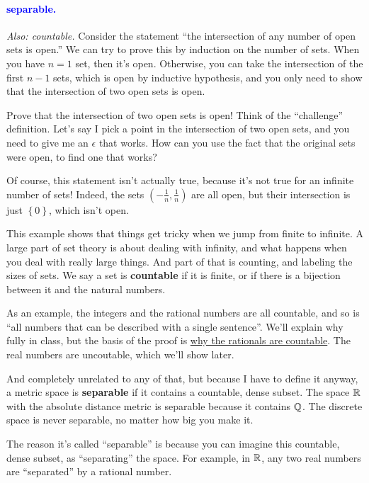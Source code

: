 \documentclass[11pt,paper=letter]{scrartcl}
\renewcommand{\bluebf}[1]{{\bfseries \color{Blue} #1}}
\renewcommand\wp[1]{\paragraph{\textcolor{Blue}{#1.}} \hspace{-1em}}
\newcommand\wl[1]{\label{w:#1}}
\newcommand\oww[1]{\textit{Also: #1.}}
\begin{document}
\wp{separable}
\wl{separable}
\oww{countable}
Consider the statement ``the intersection of any number of open sets is open.'' We can try to prove this by induction on the number of sets. When you have $n = 1$ set, then it's open. Otherwise, you can take the intersection of the first $n - 1$ sets, which is open by inductive hypothesis, and you only need to show that the intersection of two open sets is open.

\begin{exrboxed}
  Prove that the intersection of two open sets is open! Think of the ``challenge'' definition. Let's say I pick a point in the intersection of two open sets, and you need to give me an $\epsilon$ that works. How can you use the fact that the original sets were open, to find one that works?
\end{exrboxed}

Of course, this statement isn't actually true, because it's not true for an infinite number of sets! Indeed, the sets $ \left( - \frac{1}{n} , \frac{1}{n} \right) $ are all open, but their intersection is just $ \left\{ 0 \right\}  $, which isn't open.

This example shows that things get tricky when we jump from finite to infinite. A large part of set theory is about dealing with infinity, and what happens when you deal with really large things. And part of that is counting, and labeling the sizes of sets. We say a set is \textbf{countable} if it is finite, or if there is a bijection between it and the natural numbers.

As an example, the integers and the rational numbers are all countable, and so is ``all numbers that can be described with a single sentence''. We'll explain why fully in class, but the basis of the proof is \href{https://proofwiki.org/wiki/Rational_Numbers_are_Countably_Infinite}{why the rationals are countable}. The real numbers are uncoutable, which we'll show later.

And completely unrelated to any of that, but because I have to define it anyway, a metric space is \bluebf{separable} if it contains a countable, dense subset. The space $\mathbb R$ with the absolute distance metric is separable because it contains $\mathbb Q$. The discrete space is never separable, no matter how big you make it.

\begin{remboxed}
  The reason it's called ``separable'' is because you can imagine this countable, dense subset, as ``separating'' the space. For example, in $\mathbb R$, any two real numbers are ``separated'' by a rational number.
\end{remboxed}
\end{document}
